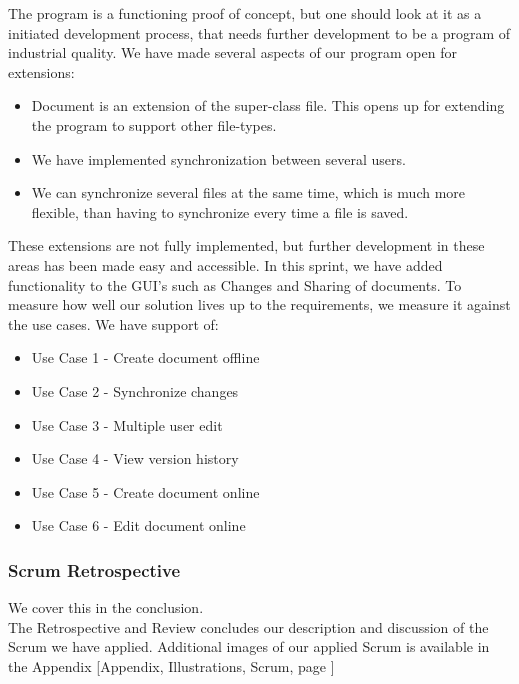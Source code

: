 The program is a functioning proof of concept, but one should look at it as a initiated development process, that needs further development to be a program of industrial quality. We have made several aspects of our program open for extensions:
\begin{itemize}
\item Document is an extension of the super-class file. This opens up for extending the program to support other file-types.
\item We have implemented synchronization between several users.
\item We can synchronize several files at the same time, which is much more flexible, than having to synchronize every time a file is saved.
\end{itemize}
These extensions are not fully implemented, but further development in these areas has been made easy and accessible.
In this sprint, we have added functionality to the GUI's such as Changes and Sharing of documents. To measure how well our solution lives up to the requirements, we measure it against the use cases. We have support of:
\begin{itemize}
\item Use Case 1 - Create document offline
\item Use Case 2 - Synchronize changes
\item Use Case 3 - Multiple user edit 
\item Use Case 4 - View version history
\item Use Case 5 - Create document online
\item Use Case 6 - Edit document online
\end{itemize}
\subsubsection{Scrum Retrospective}
We cover this in the conclusion.\\
\newline
The Retrospective and Review concludes our description and discussion of the Scrum we have applied. Additional images of our applied Scrum is available in the Appendix [Appendix, Illustrations, Scrum, page \pageref{scrumillustrations}]
\newpage